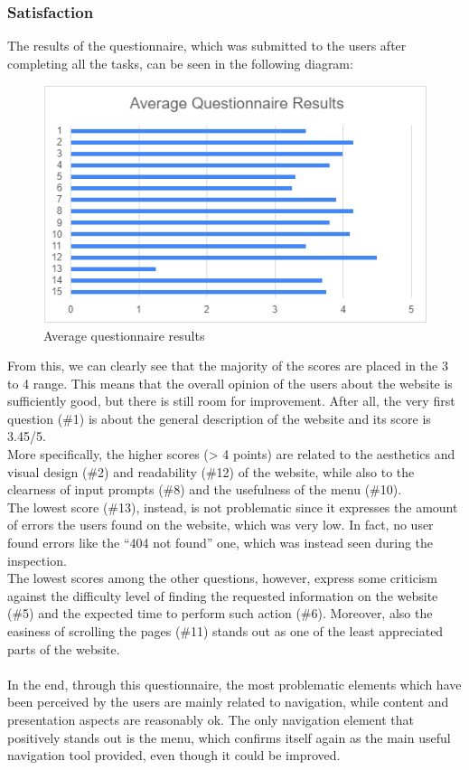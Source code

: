 \documentclass[11pt, letterpaper]{article}
\begin{document}
\subsubsection{Satisfaction}
The results of the questionnaire, which was submitted to the users after completing all the tasks, can be seen in the following diagram:
\begin{figure}[H]
    \centering
    \includegraphics[width=.6\textwidth]{images/user testing/average_questionnaire_results.png}
    \caption{Average questionnaire results}
    \label{fig:question_results}
\end{figure}
\noindent
From this, we can clearly see that the majority of the scores are placed in the 3 to 4 range. This means that the overall opinion of the users about the website is sufficiently good, but there is still room for improvement. After all, the very first question (\#1) is about the general description of the website and its score is 3.45/5. \\
More specifically, the higher scores (> 4 points) are related to the aesthetics and visual design (\#2) and readability (\#12) of the website, while also to the clearness of input prompts (\#8) and the usefulness of the menu (\#10). \\
The lowest score (\#13), instead, is not problematic since it expresses the amount of errors the users found on the website, which was very low. In fact, no user found errors like the “404 not found” one, which was instead seen during the inspection. \\
The lowest scores among the other questions, however, express some criticism against the difficulty level of finding the requested information on the website (\#5) and the expected time to perform such action (\#6). Moreover, also the easiness of scrolling the pages (\#11) stands out as one of the least appreciated parts of the website. \\
\\
In the end, through this questionnaire, the most problematic elements which have been perceived by the users are mainly related to navigation, while content and presentation aspects are reasonably ok. The only navigation element that positively stands out is the menu, which confirms itself again as the main useful navigation tool provided, even though it could be improved. 
\end{document}
